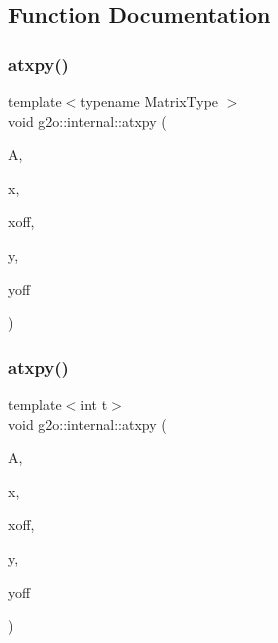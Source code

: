 \subsection{Function Documentation}
\mbox{\label{namespaceg2o_1_1internal_ad176878dff85b91f1dbabed52cbf696e}} 
\subsubsection{\texorpdfstring{atxpy()}{atxpy()}\hspace{0.1cm}{\footnotesize\ttfamily [1/2]}}
{\footnotesize\ttfamily template$<$typename Matrix\+Type $>$ \\
void g2o\+::internal\+::atxpy (\begin{DoxyParamCaption}\item[{const Matrix\+Type \&}]{A,  }\item[{const Eigen\+::\+Map$<$ const Eigen\+::\+Vector\+Xd $>$ \&}]{x,  }\item[{int}]{xoff,  }\item[{Eigen\+::\+Map$<$ Eigen\+::\+Vector\+Xd $>$ \&}]{y,  }\item[{int}]{yoff }\end{DoxyParamCaption})\hspace{0.3cm}{\ttfamily [inline]}}

\mbox{\label{namespaceg2o_1_1internal_a00b6a24b76a3fadc09136fe6232578ec}} 
\subsubsection{\texorpdfstring{atxpy()}{atxpy()}\hspace{0.1cm}{\footnotesize\ttfamily [2/2]}}
{\footnotesize\ttfamily template$<$int t$>$ \\
void g2o\+::internal\+::atxpy (\begin{DoxyParamCaption}\item[{const Eigen\+::\+Matrix$<$ double, Eigen\+::\+Dynamic, t $>$ \&}]{A,  }\item[{const Eigen\+::\+Map$<$ const Eigen\+::\+Vector\+Xd $>$ \&}]{x,  }\item[{int}]{xoff,  }\item[{Eigen\+::\+Map$<$ Eigen\+::\+Vector\+Xd $>$ \&}]{y,  }\item[{int}]{yoff }\end{DoxyParamCaption})\hspace{0.3cm}{\ttfamily [inline]}}

